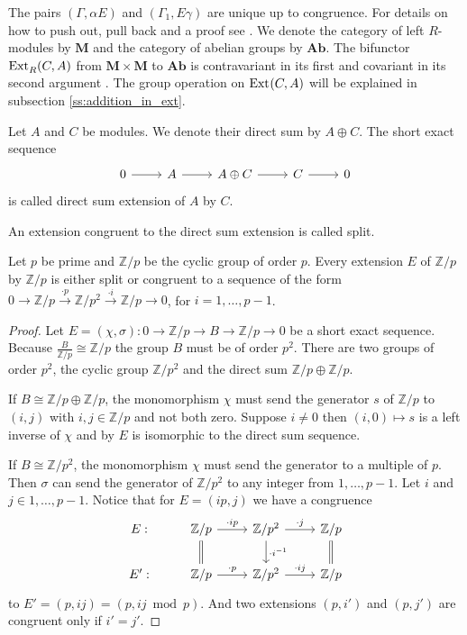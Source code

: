 The pairs $(\Gamma, \alpha E)$ and $(\Gamma_1, E \gamma)$ are unique up to congruence.
For details on how to push out, pull back and a proof see \cite[Chapter III.1.]{maclane}.
We denote the category of left $R$-modules by $\mathbf{M}$  and the category of abelian groups by $\mathbf {Ab}$.
The bifunctor $\operatorname{Ext}^{}_{R}(C,A)$ from $\mathbf {M \times M}$ to $\mathbf {Ab}$ is contravariant in its first and covariant in its second argument \cite[see Chapters III.1. and III.2.]{maclane}.
The group operation on $\operatorname{Ext}^{}(C,A)$ will be explained in subsection \ref{ss:addition_in_ext}.
\begin{definition}
Let $A$ and $C$ be modules.
We denote their direct sum by $A \oplus C$.
The short exact sequence
\[
\begin{tikzcd}
0 \arrow{r}&
A \arrow{r}&
A \oplus C \arrow{r}&
C \arrow{r}&
0
\end{tikzcd}
\]
is called direct sum extension of $A$ by $C$.
\end{definition}
An extension congruent to the direct sum extension is called split.
\begin{example}\cite[Exercise 3.4.1.]{weibel}
Let $p$ be prime and $\mathbb{Z}/p$ be the cyclic group of order $p$.
Every extension $E$ of $\mathbb{Z}/p$ by $\mathbb{Z}/p$ is either split or congruent to a sequence of the form
$0\to \mathbb{Z}/p\xrightarrow{\cdot p}\mathbb{Z}/{p^2}\xrightarrow{\cdot i}\mathbb{Z}/p\to 0$, for $i=1,\dotsc,p-1$.
\end{example}
\begin{proof}
Let $E = (\chi, \sigma) : 0 \to \mathbb{Z}/p \to B \to \mathbb{Z}/p \to 0$ be a short exact sequence.
Because $\frac{B}{\mathbb{Z}/p} \cong \mathbb{Z}/p$ the group $B$ must be of order $p^2$. %
There are two groups of order $p^2$, the cyclic group $\mathbb{Z}/{p^2}$ and the direct sum $\mathbb{Z}/p \oplus \mathbb{Z}/p$. %

If $B\cong \mathbb{Z}/p \oplus \mathbb{Z}/p$, the monomorphism $\chi$ must send the generator $s$ of $\mathbb{Z}/p$ to $(i,j)$ with $i,j\in \mathbb{Z}/p$ and not both zero.
Suppose $i\neq 0$ then $(i,0)\mapsto s$ is a left inverse of $\chi$ and by \cite[Proposition I.4.3.]{maclane} $E$ is isomorphic to the direct sum sequence.

If $B\cong \mathbb{Z}/{p^2}$, the monomorphism $\chi$ must send the generator to a multiple of $p$.
Then $\sigma$ can send the generator of $\mathbb{Z}/{p^2}$ to any integer from $1,\dotsc,p-1$.
Let $i$ and $j\in {1,\dots, p-1}$.
Notice that for $E=(ip,j)$ we have a congruence
\begin{equation*}
\begin{tikzcd}
E: &
\mathbb{Z}/p 
	\arrow{r}{\cdot ip} 
	\arrow[equal,d]&
\mathbb{Z}/p^2 
	\arrow{r}{\cdot j} 
	\arrow{d}{\cdot i^{-1}}&
\mathbb{Z}/p 
	\arrow[d,equal]
\\
E': &
\mathbb{Z}/p 
	\arrow{r}{\cdot p}&
\mathbb{Z}/p^2 
	\arrow{r}{\cdot ij}&
\mathbb{Z}/p
\end{tikzcd}
\end{equation*}
to $E' = (p,ij) = (p, ij \bmod p)$.
And two extensions $(p,i')$ and $(p,j')$ are congruent only if $i' = j'$.
\end{proof}
